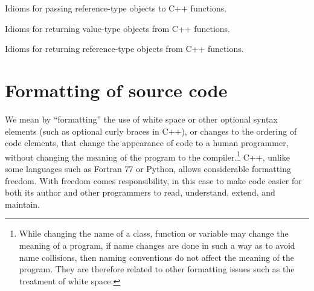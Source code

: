 \begin{table}[p]
%
\begin{center}

\end{center}
\caption{\label{fig:func_args_ref_type}
Idioms for passing reference-type objects to C++ functions.}
\end{table}




\begin{table}
%
\begin{center}
%
%

%
%
%
\end{center}
\caption{\label{fig:func_return_value_type}
Idioms for returning value-type objects from C++ functions.}
%
\end{table}


\begin{table}
%
\begin{center}
%
%

%
%
%
\end{center}
\caption{\label{fig:func_return_reference_type}
Idioms for returning reference-type objects from C++ functions.}
%
\end{table}


%
\section{Formatting of source code}
\label{tcdg:formatting:sec}
%

We mean by ``formatting'' the use of white space or other optional
syntax elements (such as optional curly braces in C++), or changes to
the ordering of code elements, that change the appearance of code to a
human programmer, without changing the meaning of the program to the
compiler.\footnote{While changing the name of a class, function or
  variable may change the meaning of a program, if name changes are
  done in such a way as to avoid name collisions, then naming
  conventions do not affect the meaning of the program.  They are
  therefore related to other formatting issues such as the treatment
  of white space.}  C++, unlike some languages such as Fortran 77 or
Python, allows considerable formatting freedom.  With freedom comes
responsibility, in this case to make code easier for both its author
and other programmers to read, understand, extend, and maintain.

